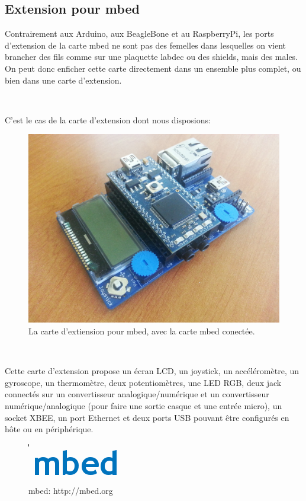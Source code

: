 \documentclass{article}
\begin{document}
\clearpage

\subsection{Extension pour mbed}
\label{mbed_ext}

Contrairement aux Arduino, aux BeagleBone et au RaspberryPi, les ports d’extension de la carte mbed ne sont pas des femelles dans lesquelles on vient brancher des fils comme sur une plaquette labdec ou des shields, mais des males. On peut donc enficher cette carte directement dans un ensemble plus complet, ou bien dans une carte d’extension.

~

C’est le cas de la carte d’extension dont nous disposions:

\begin{figure}[h!]
    \centering\includegraphics[width=\linewidth*2/3]{img/mbed_ext.jpg}
    \caption{La carte d’extiension pour mbed, avec la carte mbed conectée.}
\end{figure}

~

Cette carte d’extension propose un écran LCD, un joystick, un accéléromètre, un gyroscope, un thermomètre, deux potentiomètres, une LED RGB, deux jack connectés sur un convertisseur analogique/numérique et un convertisseur numérique/analogique (pour faire une sortie casque et une entrée micro), un socket XBEE, un port Ethernet et deux ports USB pouvant être configurés en hôte ou en périphérique.

\begin{figure}[h!]
    \centering\includegraphics{img/mbed_logo.png}
    \caption{mbed: http://mbed.org}
\end{figure}
\end{document}
